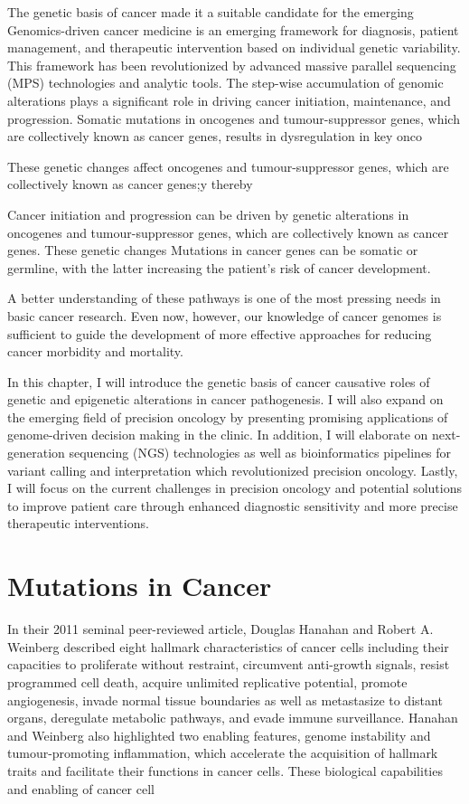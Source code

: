 The genetic basis of cancer made it a suitable candidate for the emerging Genomics-driven cancer medicine is an emerging framework for diagnosis, patient management, and therapeutic intervention based on individual genetic variability. This framework has been revolutionized by advanced massive parallel sequencing (MPS) technologies and analytic tools. The step-wise accumulation of genomic alterations plays a significant role in driving cancer initiation, maintenance, and progression. Somatic mutations in oncogenes and tumour-suppressor genes, which are collectively known as cancer genes, results in dysregulation in key onco

These genetic changes affect oncogenes and tumour-suppressor genes, which are collectively known as cancer genes;y thereby

Cancer initiation and progression can be driven by genetic alterations in oncogenes and tumour-suppressor genes, which are collectively known as cancer genes. These genetic changes Mutations in cancer genes can be somatic or germline, with the latter increasing the patient's risk of cancer development.

A better understanding of these pathways is one of the most pressing needs in basic cancer research. Even now, however, our knowledge of cancer genomes is sufficient to guide the development of more effective approaches for reducing cancer morbidity and mortality.

In this chapter, I will introduce the genetic basis of cancer causative roles of genetic and epigenetic alterations in cancer pathogenesis. I will also expand on the emerging field of precision oncology by presenting promising applications of genome-driven decision making in the clinic. In addition, I will elaborate on next-generation sequencing (NGS) technologies as well as bioinformatics pipelines for variant calling and interpretation which revolutionized precision oncology. Lastly, I will focus on the current challenges in precision oncology and potential solutions to improve patient care through enhanced diagnostic sensitivity and more precise therapeutic interventions.

\section{Mutations in Cancer}
\label{sec:MutationsinCancer}

In their 2011 seminal peer-reviewed article, Douglas Hanahan and Robert A. Weinberg described eight hallmark characteristics of cancer cells including their capacities to proliferate without restraint, circumvent anti-growth signals, resist programmed cell death, acquire unlimited replicative potential, promote angiogenesis, invade normal tissue boundaries as well as metastasize to distant organs, deregulate metabolic pathways, and evade immune surveillance. Hanahan and Weinberg also highlighted two enabling features, genome instability and tumour-promoting inflammation, which accelerate the acquisition of hallmark traits and facilitate their functions in cancer cells. These biological capabilities and enabling of cancer cell

